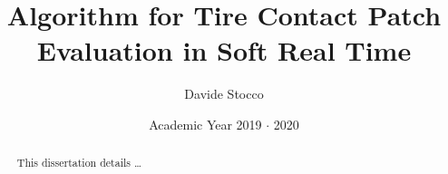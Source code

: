 \documentclass[12pt,a4paper,twoside]{memoir} %
\title{\textbf{Algorithm for Tire Contact Patch Evaluation in Soft Real Time}} %
\author{Davide Stocco} %
\date{Academic Year 2019 $\cdot$ 2020} %
\begin{document}
\begin{titlingpage}
\maketitle %
\end{titlingpage}

\frontmatter %


%

\cleartoverso %


\begin{abstract}
This dissertation details \dots
\end{abstract}

\cleartoverso %

\end{document}
